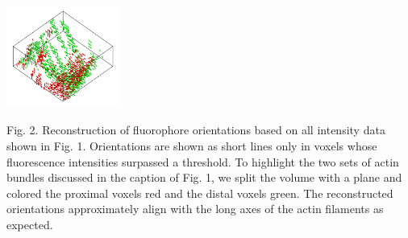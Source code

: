 \documentclass[letterpaper,10pt]{article}
\begin{document}
\vspace{-1.22em}
\begin{minipage}{.263\textwidth}
  \includegraphics[width=3.7cm, trim={0cm 0cm 0 0cm}, right]{figs/roi2/recon_color.png}
\end{minipage}%
\begin{minipage}{.639\textwidth}
  Fig. 2. Reconstruction of fluorophore orientations based on all intensity
    data shown in Fig. 1. Orientations are shown as short lines only in voxels
    whose fluorescence intensities surpassed a threshold. To highlight the two
    sets of actin bundles discussed in the caption of Fig. 1, we split the
    volume with a plane and colored the proximal voxels red and the distal
    voxels green. The reconstructed orientations approximately align with the
    long axes of the actin filaments as expected.
\end{minipage}
 \vspace{-1em}
{\footnotesize{}}

\end{document}
